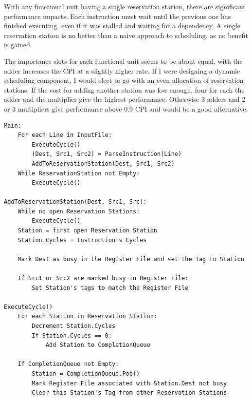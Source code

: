 \documentclass[twocolumn,letterpaper,10pt]{article}
\begin{document}
With any functional unit having a single reservation station, there are significant performance impacts. Each instruction must wait until the previous one has finished executing, even if it was stalled and waiting for a dependency. A single reservation station is no better than a naive approach to scheduling, as no benefit is gained.

The importance slots for each functional unit seems to be about equal, with the adder increases the CPI at a slightly higher rate. If I were designing a dynamic scheduling component, I would elect to go with an even allocation of reservation stations. If the cost for adding another station was low enough, four for each the adder and the multiplier give the highest performance. Otherwise 3 adders and 2 or 3 multipliers give performance above 0.9 CPI and would be a good alternative. 

\clearpage

\begin{lstlisting}[]
Main:
	For each Line in InputFile:
		ExecuteCycle()
		(Dest, Src1, Src2) = ParseInstruction(Line)
		AddToReservationStation(Dest, Src1, Src2)
	While ReservationStation not Empty:
		ExecuteCycle()

AddToReservationStation(Dest, Src1, Src):
	While no open Reservation Stations:
		ExecuteCycle()
	Station = first open Reservation Station
	Station.Cycles = Instruction's Cycles

	Mark Dest as busy in the Register File and set the Tag to Station

	If Src1 or Src2 are marked busy in Register File:
		Set Station's tags to match the Register File

ExecuteCycle()
	For each Station in Reservation Station:
		Decrement Station.Cycles
		If Station.Cycles == 0:
			Add Station to CompletionQueue
	
	If CompletionQueue not Empty:
		Station = CompletionQueue.Pop()
		Mark Register File associated with Station.Dest not busy
		Clear this Station's Tag from other Reservation Stations
		
\end{lstlisting}
\end{document}
